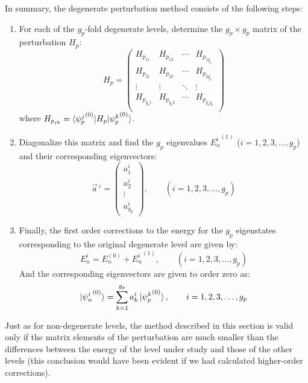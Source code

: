 In summary, the degenerate perturbation method consists of the following steps:
\begin{enumerate}
    \item For each of the $g_p$-fold degenerate levels, determine the $g_p\times g_p$ matrix of the perturbation $H_p$:
    \begin{equation}
        H_p = \begin{pmatrix}
        H_{p_{11}} & H_{p_{12}} & \cdots & H_{p_{1g_p}} \\
        H_{p_{21}} & H_{p_{22}} & \cdots & H_{p_{2g_p}} \\
        \vdots & \vdots & \ddots & \vdots \\
        H_{p_{g_p1}} & H_{p_{g_p2}} & \cdots & H_{p_{g_pg_p}} \\
        \end{pmatrix}
    \end{equation}
    where $H_{p_{jk}} = \braket{{\psi_p^j}^{(0)}|H_p|{\psi_p^k}^{(0)}}$.
    \item Diagonalize this matrix and find the $g_p$ eigenvalues ${E_n^i}^{(1)}$ ($i = 1, 2, 3, \dots, g_p$) and their corresponding eigenvectors:
    \begin{equation}
        \vec{a}\,^i = \begin{pmatrix}
            a_1^i \\ a_2^i \\ \vdots \\ a_{g_p}^i 
        \end{pmatrix},\qquad (i = 1, 2, 3, \dots, g_p)
    \end{equation} 
    \item Finally, the first order corrections to the energy for the $g_p$ eigenstates corresponding to the original degenerate level are given by:
    \begin{equation}
        E_n^i = E_n^{(0)} + {E_n^i}^{(1)},\qquad (i = 1, 2, 3, \dots, g_p)
    \end{equation}
    And the corresponding eigenvectors are given to order zero as:
    \begin{equation}
        \ket{{\psi_n^i}^{(0)}} = \sum_{k=1}^{g_p} a_k^i\ket{{\psi_p^k}^{(0)}}, \qquad i = 1, 2, 3, \dots, g_p
    \end{equation}
\end{enumerate}

Just as for non-degenerate levels, the method described in this section is valid only if the matrix elements of the perturbation are much smaller than the differences between the energy of the level under study and those of the other levels (this conclusion would have been evident if we had calculated higher-order corrections).

